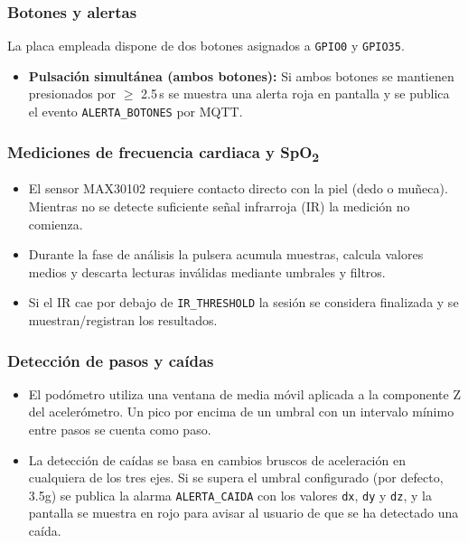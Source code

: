 \documentclass[12pt, a4paper]{article}
\begin{document}
\begin{umaappendices}
	
	\subsubsection{Botones y alertas}
	La placa empleada dispone de dos botones asignados a \texttt{GPIO0} y \texttt{GPIO35}. 
	\begin{itemize}
		\item \textbf{Pulsación simultánea (ambos botones):} Si ambos botones se mantienen presionados por \(\geq\) 2.5\,s se muestra una alerta roja en pantalla y se publica el evento \texttt{ALERTA\_BOTONES} por MQTT.
	\end{itemize}
	
	\subsubsection{Mediciones de frecuencia cardiaca y SpO\textsubscript{2}}
	\begin{itemize}
		\item El sensor MAX30102 requiere contacto directo con la piel (dedo o muñeca). Mientras no se detecte suficiente señal infrarroja (IR) la medición no comienza.
		\item Durante la fase de análisis la pulsera acumula muestras, calcula valores medios y descarta lecturas inválidas mediante umbrales y filtros.
		\item Si el IR cae por debajo de \texttt{IR\_THRESHOLD} la sesión se considera finalizada y se muestran/registran los resultados.
	\end{itemize}
	
	\subsubsection{Detección de pasos y caídas}
	\begin{itemize}
		\item El podómetro utiliza una ventana de media móvil aplicada a la componente Z del acelerómetro. Un pico por encima de un umbral con un intervalo mínimo entre pasos se cuenta como paso.
		\item La detección de caídas se basa en cambios bruscos de aceleración en cualquiera de los tres ejes. 
		Si se supera el umbral configurado (por defecto, 3.5g) se publica la alarma \texttt{ALERTA\_CAIDA} con los valores \texttt{dx}, \texttt{dy} y \texttt{dz}, y la pantalla se muestra en rojo para avisar al usuario de que se ha detectado una caída.
	\end{itemize}
	

\end{umaappendices}
\end{document}
